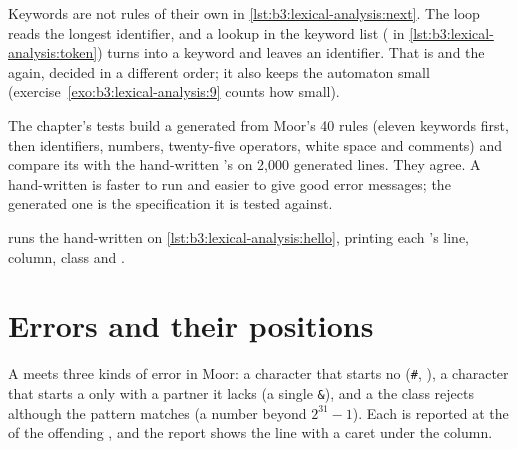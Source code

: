 \label{lst:b3:lexical-analysis:symbol}

Keywords are not rules of their own in \cref{lst:b3:lexical-analysis:next}. The loop reads the longest identifier, and a lookup in the keyword list ( in \cref{lst:b3:lexical-analysis:token}) turns  into a keyword and leaves  an identifier. That is  and the  again, decided in a different order; it also keeps the automaton small (exercise~\ref{exo:b3:lexical-analysis:9} counts how small).

\begin{remark}\label{rem:b3:lexical-analysis:agree}
The chapter's tests build a generated  from Moor's 40 rules (eleven keywords first, then identifiers, numbers, twenty-five operators, white space and comments) and compare its  with the hand-written 's on 2,000 generated lines. They agree. A hand-written  is faster to run and easier to give good error messages; the generated one is the specification it is tested against.
\end{remark}

 runs the hand-written  on \cref{lst:b3:lexical-analysis:hello}, printing each 's line, column, class and .

\label{out:b3:lexical-analysis:demo}

\section{Errors and their positions}\label{sec:b3:lexical-analysis:errors}

A  meets three kinds of error in Moor: a character that starts no  (\texttt{\#}, ), a character that starts a  only with a partner it lacks (a single \texttt{\&}), and a  the class rejects although the pattern matches (a number beyond $2^{31} - 1$). Each is reported at the  of the offending , and the report shows the line with a caret under the column.


